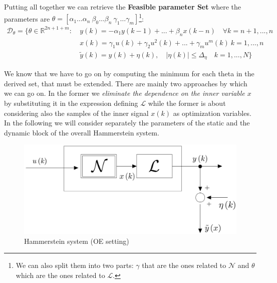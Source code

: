 \noindent
Putting all together we can retrieve the    \textbf{Feasible parameter Set} where the parameters are $\theta=[\alpha_1 \dots \alpha_n \ \beta_0 \dots \beta_n \ \gamma_1 \dots \gamma_m]$\footnote{
    We can also split them into two parts: $\gamma$ that are the ones related to $\mathcal{N}$ and $\theta$ which are the ones related to $\mathcal{L}$.
}: 
\begin{equation}
    \begin{aligned}
        \mathcal{D}_\theta=\big\{
        \theta\in\mathbb{R}^{2n+1+m}: \ 
        &y(k)=-\alpha_1{y(k-1)+...+\beta_n{x(k-n)}} \quad \forall{k=n+1,...,n}\\
        & x(k)=\gamma_1{u(k)}+\gamma_2{u^2(k)}+...+\gamma_m{u^{m}(k)} \ k=1,...,n \\
        &\tilde{y}(k)=y(k)+\eta(k), \quad 
        \vert \eta(k) \vert \le \Delta_\eta \quad k=1,..., N
    \big\}
    \end{aligned}
\end{equation}

\noindent
We know that we have to go on by computing the minimum for each theta in the derived set, that must be extended. There are mainly two approaches by which we can go on. In the former we \textit{eliminate the dependence on the inner variable $x$} by substituting it in the expression defining $\mathcal{L}$ while the former is about considering also the samples of the inner signal $x(k)$ as optimization variables. In the following we will consider separately the parameters of the static and the dynamic block of the overall Hammerstein system.

\begin{figure}
    \centering
    \includegraphics[scale=0.2]{img/hammer_OE.jpg}
    \caption{Hammerstein system (OE setting)}
\end{figure}

